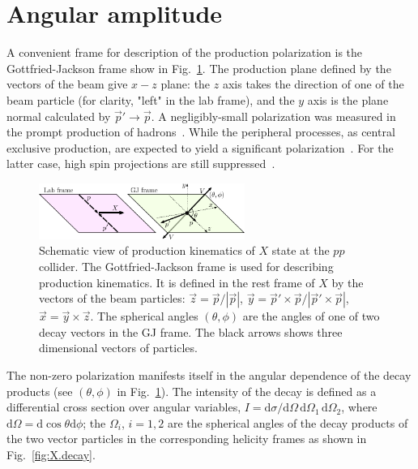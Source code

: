 \documentclass[prd,preprintnumbers,floatfix,
nofootinbib,superscriptaddress]{revtex4}
\newcommand{\diff}{\mathrm{d}}
\begin{document}
\section{Angular amplitude}
A convenient frame for description of the production polarization is the Gottfried-Jackson frame
show in Fig.~\ref{fig:production}. The production plane defined by the vectors of the beam give $x-z$ plane:
the $z$ axis takes the direction of one of the beam particle (for clarity, "left" in the lab frame),
and the $y$ axis is the plane normal calculated by $\vec p'\to \vec p$.
A negligibly-small polarization was measured in the prompt production of hadrons~\cite{Lambda@ATLAS, Charmoniub, Lambdab}.
While the peripheral processes, as central exclusive production, are expected to yield a significant polarization~\cite{}. For the latter case, high spin projections are still suppressed~\cite{Chung-Treiman}.
\begin{figure}
  \includegraphics[width=0.6\textwidth]{../plots/production_GJ.pdf}
  \caption{Schematic view of production kinematics of $X$ state at the $pp$ collider.
  The Gottfried-Jackson frame is used for describing production kinematics.
  It is defined in the rest frame of $X$ by the vectors of the beam particles:
  $\vec z = \vec p / |\vec p|$, $\vec y = \vec p' \times \vec p / |\vec p' \times \vec p|$, $\vec x = \vec y \times \vec z$.
  The spherical angles $(\theta,\phi)$ are the angles of one of two decay vectors in the GJ frame.
  The black arrows shows three dimensional vectors of particles.}
  \label{fig:production}
\end{figure}

The non-zero polarization manifests itself in the angular dependence of the decay products (see $(\theta,\phi)$ in Fig.~\ref{fig:production}).
The intensity of the decay is defined as a differential cross section over angular variables,
$I = \diff \sigma / \diff \Omega\,\diff \Omega_1\,\diff \Omega_2$, where
$\diff\Omega = \diff\cos\theta \diff \phi$; the $\Omega_i$, $i=1,2$ are the spherical angles of the decay products of the two vector particles in the corresponding helicity frames as shown in Fig.~\ref{fig:X.decay}.
\end{document}
